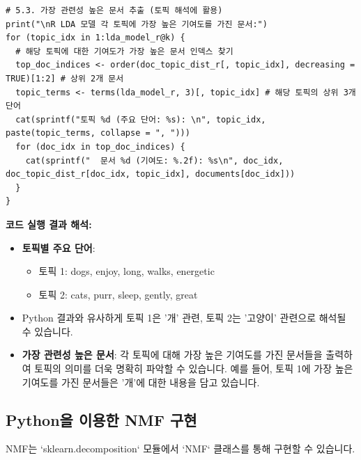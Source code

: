 \documentclass[11pt,a4paper]{article}
\begin{document}
\begin{lstlisting}[caption={R을 이용한 LDA 구현 예시}, label={lst:r_lda}]
# 5.3. 가장 관련성 높은 문서 추출 (토픽 해석에 활용)
print("\nR LDA 모델 각 토픽에 가장 높은 기여도를 가진 문서:")
for (topic_idx in 1:lda_model_r@k) {
  # 해당 토픽에 대한 기여도가 가장 높은 문서 인덱스 찾기
  top_doc_indices <- order(doc_topic_dist_r[, topic_idx], decreasing = TRUE)[1:2] # 상위 2개 문서
  topic_terms <- terms(lda_model_r, 3)[, topic_idx] # 해당 토픽의 상위 3개 단어
  cat(sprintf("토픽 %d (주요 단어: %s): \n", topic_idx, paste(topic_terms, collapse = ", ")))
  for (doc_idx in top_doc_indices) {
    cat(sprintf("  문서 %d (기여도: %.2f): %s\n", doc_idx, doc_topic_dist_r[doc_idx, topic_idx], documents[doc_idx]))
  }
}
\end{lstlisting}

\begin{examplebox}
\textbf{코드 실행 결과 해석:}
\begin{itemize}
    \item \textbf{토픽별 주요 단어}:
    \begin{itemize}
        \item 토픽 1: dogs, enjoy, long, walks, energetic
        \item 토픽 2: cats, purr, sleep, gently, great
    \end{itemize}
    \item Python 결과와 유사하게 토픽 1은 '개' 관련, 토픽 2는 '고양이' 관련으로 해석될 수 있습니다.
    \item \textbf{가장 관련성 높은 문서}: 각 토픽에 대해 가장 높은 기여도를 가진 문서들을 출력하여 토픽의 의미를 더욱 명확히 파악할 수 있습니다. 예를 들어, 토픽 1에 가장 높은 기여도를 가진 문서들은 '개'에 대한 내용을 담고 있습니다.
\end{itemize}
\end{examplebox}

\newpage
\subsection*{Python을 이용한 NMF 구현}
NMF는 `sklearn.decomposition` 모듈에서 `NMF` 클래스를 통해 구현할 수 있습니다.
\end{document}
